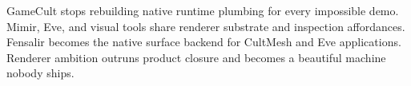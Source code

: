 \ProjectionBand
{GameCult stops rebuilding native runtime plumbing for every impossible demo.}
{Mimir, Eve, and visual tools share renderer substrate and inspection affordances.}
{Fensalir becomes the native surface backend for CultMesh and Eve applications.}
{Renderer ambition outruns product closure and becomes a beautiful machine nobody ships.}

